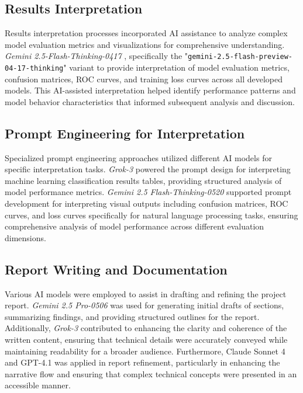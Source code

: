 \subsection{Results Interpretation}

Results interpretation processes incorporated AI assistance to analyze complex model evaluation metrics and visualizations for comprehensive understanding. \textit{Gemini 2.5-Flash-Thinking-0417} \parencite{Doshi_2025}, specifically the "\texttt{gemini-2.5-flash-preview-04-17-thinking}" variant to provide interpretation of model evaluation metrics, confusion matrices, ROC curves, and training loss curves across all developed models. This AI-assisted interpretation helped identify performance patterns and model behavior characteristics that informed subsequent analysis and discussion.

\subsection{Prompt Engineering for Interpretation}

Specialized prompt engineering approaches utilized different AI models for specific interpretation tasks. \textit{Grok-3} \parencite{xGrokBeta} powered the prompt design for interpreting machine learning classification results tables, providing structured analysis of model performance metrics. \textit{Gemini 2.5 Flash-Thinking-0520} \parencite{Doshi_2025} supported prompt development for interpreting visual outputs including confusion matrices, ROC curves, and loss curves specifically for natural language processing tasks, ensuring comprehensive analysis of model performance across different evaluation dimensions.

\subsection{Report Writing and Documentation}

Various AI models were employed to assist in drafting and refining the project report. \textit{Gemini 2.5 Pro-0506} \parencite{2025geminipro} was used for generating initial drafts of sections, summarizing findings, and providing structured outlines for the report. Additionally, \textit{Grok-3} \parencite{xGrokBeta} contributed to enhancing the clarity and coherence of the written content, ensuring that technical details were accurately conveyed while maintaining readability for a broader audience. Furthermore, Claude Sonnet 4 \parencite{claude4} and GPT-4.1 \parencite{opengpt41} was applied in report refinement, particularly in enhancing the narrative flow and ensuring that complex technical concepts were presented in an accessible manner.

